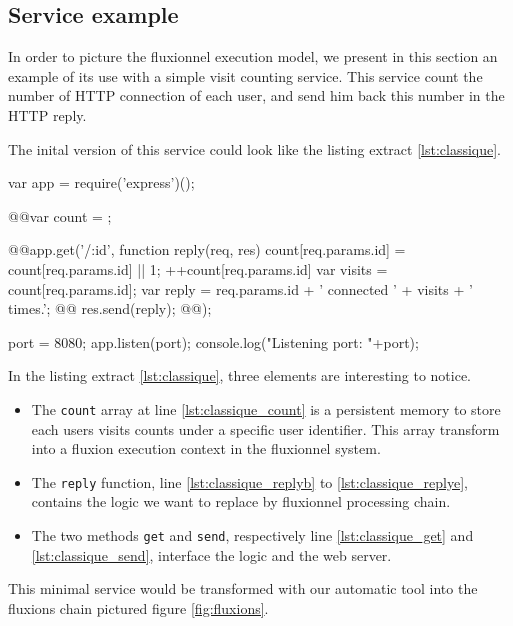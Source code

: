 
\subsection{Service example}

In order to picture the fluxionnel execution model, we present in this section an example of its use with a simple visit counting service.
This service count the number of HTTP connection of each user, and send him back this number in the HTTP reply.

The inital version of this service could look like the listing extract \ref{lst:classique}.

\begin{code}[Javascript, caption={Service initial},label={lst:classique}]
var app = require('express')();

@\label{lst:classique_count}@var count = {};

@\label{lst:classique_get}\label{lst:classique_replyb}@app.get('/:id', function reply(req, res){
  count[req.params.id] = count[req.params.id]  || 1;
  ++count[req.params.id]
  var visits = count[req.params.id];
  var reply = req.params.id + ' connected ' + visits + ' times.';
@\label{lst:classique_send}@  res.send(reply);
@\label{lst:classique_replye}@});

port = 8080;
app.listen(port);
console.log("Listening port: "+port);
\end{code}

In the listing extract \ref{lst:classique}, three elements are interesting to notice.

\begin{itemize}
  \item The \texttt{count} array at line \ref{lst:classique_count} is a persistent memory to store each users visits counts under a specific user identifier.
  This array transform into a fluxion execution context in the fluxionnel system.
  \item The \texttt{reply} function, line \ref{lst:classique_replyb} to \ref{lst:classique_replye}, contains the logic we want to replace by fluxionnel processing chain.
  \item The two methods \texttt{get} and \texttt{send}, respectively line \ref{lst:classique_get} and \ref{lst:classique_send}, interface the logic and the web server.
\end{itemize}

This minimal service would be transformed with our automatic tool into the fluxions chain pictured figure \ref{fig:fluxions}.

